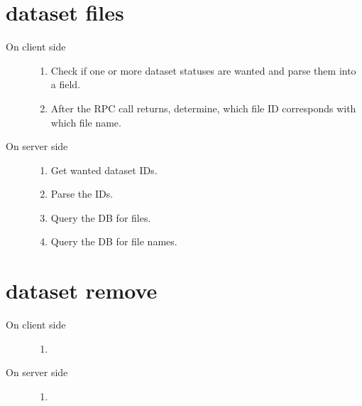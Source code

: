 \documentclass{scrreprt}
\begin{document}
\section{dataset files} 
\begin{description}
%
\item[On client side] \hfill
\begin{enumerate} 
\item Check if one or more dataset statuses are wanted and parse them into a field.
\item After the RPC call returns, determine, which file ID corresponds with which file name.
\end{enumerate}
%
\item[On server side] \hfill
\begin{enumerate} 
\item Get wanted dataset IDs.
\item Parse the IDs. 
\item Query the DB for files.
\item Query the DB for file names.

\end{enumerate}

\end{description}



\section{dataset remove} 
\begin{description}

%
\item[On client side] \hfill
\begin{enumerate} 
\item

\end{enumerate}
%
\item[On server side] \hfill
\begin{enumerate} 
\item

\end{enumerate}

\end{description}
\end{document}
